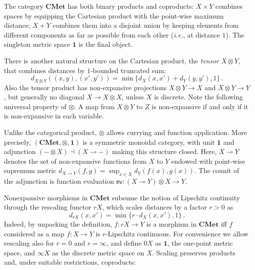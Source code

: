 \documentclass[a4paper,UKenglish,cleveref, autoref, thm-restate]{lipics-v2021}
\newcommand{\ie}{\textit{i.e.}}
\newcommand{\lol}{\mathbin{\multimap}}
\newcommand{\cat}[1]{\mathbf{#1}}
\newcommand{\CMet}{\cat{CMet}}
\newcommand{\mprod}{\otimes}
\newcommand{\mexp}{\lol}
\newcommand{\unit}{\mathbf{1}}
\newcommand{\extpreals}{[0,\infty]}
\newcommand{\scaling}{}
\newcommand{\iso}{\cong}
\begin{document}
The category $\CMet$ has both binary products and coproducts: $X \times Y$ combines spaces by equipping the Cartesian product with the point-wise maximum distance; $X + Y$ combines them into a disjoint union by keeping elements from different components as far as possible from each other (\ie, at distance $1$). The singleton metric space $\unit$ is the final object.

There is another natural structure on the Cartesian product, the \emph{tensor} $X \mprod Y$, that combines distances by $1$-bounded truncated sum:
\begin{equation*}
    d_{X \mprod Y}((x,y),(x',y')) = \min \{ d_X(x,x') + d_Y(y,y'), 1 \} \,.
\end{equation*} 
Also the tensor product has non-expansive projections
$X \mprod Y \to X$ and $X \mprod Y \to Y$, but generally no diagonal $X \to X \mprod X$, unless $X$ is discrete. 
Note the following universal property of $\mprod$: A map from $X \mprod Y$ to $Z$ is non-expansive if
and only if it is non-expansive in each variable.

Unlike the categorical product, $\mprod$ allows currying and function application. More precisely, $(\CMet, \mprod, \unit)$ is a symmetric monoidal category, with unit $\unit$ and adjunction $(- \mprod X) \dashv (X \mexp -)$ making this structure closed. Here, $X \mexp Y$ denotes the set of non-expansive functions from $X$ to $Y$ endowed with point-wise supremum metric $d_{X \mexp Y}(f,g) = \sup_{x \in X} d_Y(f(x),g(x))$.
The counit of the adjunction is function evaluation
$\mathsf{ev}\colon (X \mexp Y) \mprod X \to Y$.

Nonexpansive morphisms in $\CMet$ subsume the notion of Lipschitz continuity through the rescaling functor $r \scaling X$, which scales distances by a  factor $r > 0$ as
\begin{equation*}
  d_{r\scaling X}(x,x') = 
  \min \{ r \cdot d_X(x,x'), 1 \} \,.
\end{equation*}
Indeed, by unpacking the definition, $f \colon r \scaling X \to Y$ is a morphism in $\CMet$ iff $f$ considered as a map $f \colon X \to Y$ is $r$-Lipschitz continuous.
For convenience we allow rescaling also for $r = 0$ and $r = \infty$,
and define $0 \scaling X$ as $\unit$, the one-point metric space, and $\infty \scaling X$ as the discrete metric space on $X$. Scaling preserves products and, under suitable restrictions, coproducts:
\end{document}
